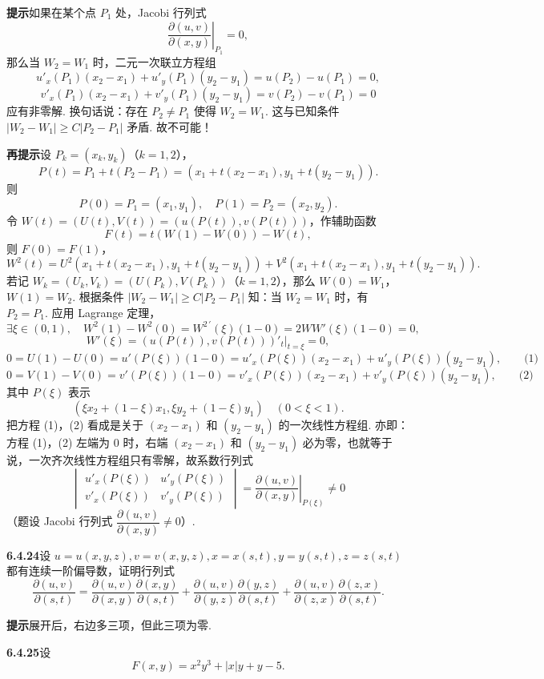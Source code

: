 \documentclass[UTF8,12pt,a4paper,fontset=fandol]{ctexart}
\begin{document}
\noindent\textbf{提示}\quad 如果在某个点 $P_1$ 处，Jacobi 行列式
\[
  \left.\frac{\partial(u,v)}{\partial(x,y)}\right|_{P_1}=0,
\]
那么当 $W_2=W_1$ 时，二元一次联立方程组
\[
  u'_x(P_1)(x_2-x_1)+u'_y(P_1)(y_2-y_1)=u(P_2)-u(P_1)=0,
\]
\[
  v'_x(P_1)(x_2-x_1)+v'_y(P_1)(y_2-y_1)=v(P_2)-v(P_1)=0
\]
应有非零解. 换句话说：存在 $P_2\ne P_1$ 使得 $W_2=W_1$. 这与已知条件
$|W_2-W_1|\ge C|P_2-P_1|$ 矛盾. 故不可能！

\noindent\textbf{再提示}\quad 设 $P_k=(x_k,y_k)$（$k=1,2$），
\[
  P(t)=P_1+t(P_2-P_1)=(x_1+t(x_2-x_1),y_1+t(y_2-y_1)).
\]
则
\[
  P(0)=P_1=(x_1,y_1),\quad P(1)=P_2=(x_2,y_2).
\]
令 $W(t)=(U(t),V(t))=(u(P(t)),v(P(t)))$，作辅助函数
\[
  F(t)=t(W(1)-W(0))-W(t),
\]
则 $F(0)=F(1)$，
\[
  W^2(t)=U^2(x_1+t(x_2-x_1),y_1+t(y_2-y_1))
  +V^2(x_1+t(x_2-x_1),y_1+t(y_2-y_1)).
\]
若记 $W_k=(U_k,V_k)=(U(P_k),V(P_k))$（$k=1,2$），那么 $W(0)=W_1$，
$W(1)=W_2$. 根据条件 $|W_2-W_1|\ge C|P_2-P_1|$ 知：当 $W_2=W_1$ 时，有 $P_2=P_1$. 应用 Lagrange 定理，
\[
  \exists\xi\in(0,1),\quad
  W^2(1)-W^2(0)=W^{2\,\prime}(\xi)(1-0)=2WW'(\xi)(1-0)=0,
\]
\[
  W'(\xi)=(u(P(t)),v(P(t)))'_t|_{t=\xi}=0,
\]
\[
  0=U(1)-U(0)=u'(P(\xi))(1-0)
  =u'_x(P(\xi))(x_2-x_1)+u'_y(P(\xi))(y_2-y_1), \qquad\text{(1)}
\]
\[
  0=V(1)-V(0)=v'(P(\xi))(1-0)
  =v'_x(P(\xi))(x_2-x_1)+v'_y(P(\xi))(y_2-y_1), \qquad\text{(2)}
\]
其中 $P(\xi)$ 表示
\[
  (\xi x_2+(1-\xi)x_1,\xi y_2+(1-\xi)y_1)\quad(0<\xi<1).
\]
把方程 (1)，(2) 看成是关于 $(x_2-x_1)$ 和 $(y_2-y_1)$ 的一次线性方程组. 亦即：方程 (1)，(2) 左端为 $0$ 时，右端 $(x_2-x_1)$ 和 $(y_2-y_1)$ 必为零，也就等于说，一次齐次线性方程组只有零解，故系数行列式
\[
  \begin{vmatrix}
    u'_x(P(\xi)) & u'_y(P(\xi))\\
    v'_x(P(\xi)) & v'_y(P(\xi))
  \end{vmatrix}
  =
  \left.\frac{\partial(u,v)}{\partial(x,y)}\right|_{P(\xi)}
  \ne0
\]
（题设 Jacobi 行列式 $\dfrac{\partial(u,v)}{\partial(x,y)}\ne0$）.

\noindent\textbf{6.4.24}\quad 设 $u=u(x,y,z),v=v(x,y,z),x=x(s,t),y=y(s,t),z=z(s,t)$ 都有连续一阶偏导数，证明行列式
\[
  \frac{\partial(u,v)}{\partial(s,t)}
  =
  \frac{\partial(u,v)}{\partial(x,y)}
  \frac{\partial(x,y)}{\partial(s,t)}
  +
  \frac{\partial(u,v)}{\partial(y,z)}
  \frac{\partial(y,z)}{\partial(s,t)}
  +
  \frac{\partial(u,v)}{\partial(z,x)}
  \frac{\partial(z,x)}{\partial(s,t)}.
\]

\noindent\textbf{提示}\quad 展开后，右边多三项，但此三项为零.

\noindent\textbf{6.4.25}\quad 设
\[
  F(x,y)=x^2y^3+|x|y+y-5.
\]
\end{document}
